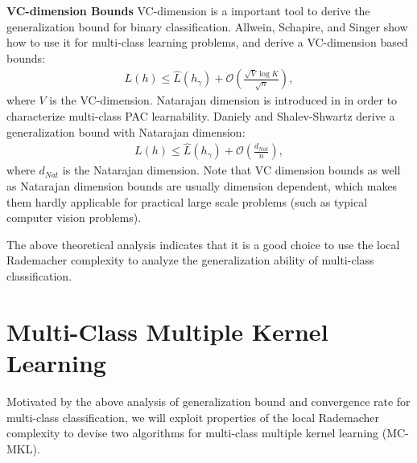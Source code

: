 \documentclass{article}
\begin{document}
\textbf{VC-dimension Bounds}
VC-dimension is a important tool to derive the generalization bound for binary classification.
Allwein, Schapire, and Singer  show how to use it
for multi-class learning problems,
and derive a VC-dimension based bounds:
\begin{align*}
   L(h)\leq  \hat{L}(h_\gamma) +\mathcal{O}\left(\frac{\sqrt{V}\log K}{\sqrt{n}}\right),
\end{align*}
where $V$ is the VC-dimension.
Natarajan dimension is introduced in \cite{Natarajan1989} in
order to characterize multi-class PAC learnability.
Daniely and Shalev-Shwartz  derive a generalization bound with Natarajan dimension:
\begin{align*}
   L(h)\leq  \hat{L}(h_\gamma) +\mathcal{O}\left(\frac{d_{Nat}}{n}\right),
\end{align*}
where $d_{Nat}$ is the Natarajan dimension.
Note that VC dimension bounds as well as Natarajan dimension bounds are usually dimension
dependent, which makes them hardly applicable for practical large
scale problems (such as typical computer vision problems).

The above theoretical analysis indicates that it is a good
choice to use the local Rademacher complexity to analyze the generalization
ability of multi-class classification.

\section{Multi-Class Multiple Kernel Learning}
Motivated by the above analysis of generalization bound and convergence rate for multi-class classification, we will exploit properties of the local Rademacher complexity
to devise two algorithms for multi-class multiple kernel learning (MC-MKL).
\end{document}
